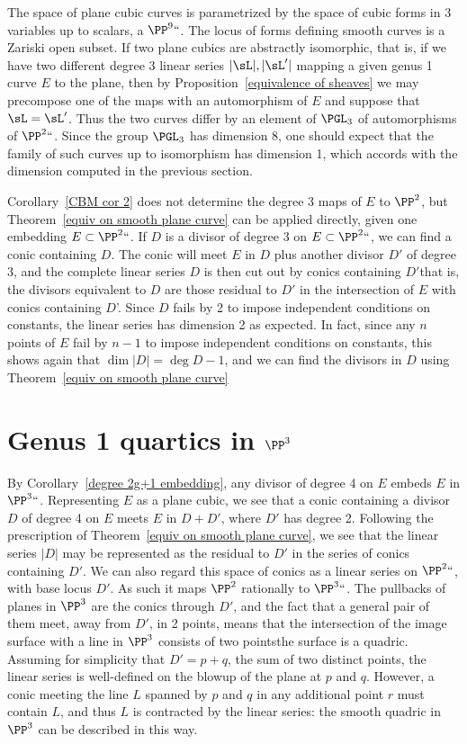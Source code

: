The space of plane cubic curves is parametrized by the space of
cubic forms
%
in 3 variables up to
scalars, a  $\PP^9` `$. The locus of forms defining smooth curves is a Zariski open subset. If two plane cubics are abstractly
isomorphic, that is, if we have two different degree 3 linear series
$|\sL|, |\sL'|$ mapping a given genus 1 curve $E$ to the plane, then by
Proposition~\ref{equivalence of sheaves} we may  precompose one of the maps with an automorphism of $E$
and suppose that $\sL = \sL'$. Thus the two curves differ by an
element of
$\PGL_3$
%
of automorphisms of $\PP^2` `$. Since the group
$\PGL_3$ has dimension 8, one should expect that the family of such
curves up to isomorphism has dimension 1, which accords with the
dimension computed in the previous section.

Corollary~\ref{CBM cor 2} does not determine the degree 3 maps of $E$ to $\PP^{2}$, but Theorem~\ref{equiv on smooth plane curve} can be applied directly, given one embedding $E\subset \PP^2` `$. If $D$ is a divisor of degree 3 on $E\subset \PP^2` `$, we can
find a conic containing $D$. The conic will meet $E$ in $D$ plus another divisor $D'$ of degree 3, and the complete linear series
$D$ is then cut out by conics containing $D'$\emdash  that is, the divisors equivalent to $D$ are those residual to $D'$ in the intersection
of $E$ with conics containing $D$'. Since $D$ fails by 2 to impose independent conditions on constants, the linear series has dimension 2 as expected. In fact, since any $n$ points of $E$ fail by $n-1$ to impose independent conditions on constants, this shows again
that $\dim |D| = \deg D -1$, and we can find the divisors in $D$ using Theorem~\ref{equiv on smooth plane curve}

\section{Genus 1 quartics in $\PP^3$} \label{g=1 in P3}

By Corollary~\ref{degree 2g+1 embedding}, any
divisor of degree 4
on
$E$ embeds $E$ in $\PP^3` `$. Representing $E$ as a plane cubic, we
see that a conic containing a divisor $D$ of degree 4 on $E$ meets $E$
in $D+D'$, where $D'$ has degree 2.
Following the prescription
of Theorem~\ref{equiv on smooth plane curve}, we see that the linear series $|D|$ may be represented as the residual to
$D'$ in the
series of conics containing $D'$. We can also regard this space of conics as a linear series on $\PP^2` `$, with base locus $D'$.
As such it maps $\PP^2$ rationally to $\PP^3` `$. The pullbacks of planes in $\PP^3$ are the conics through $D'$, and the fact that a general pair of them meet,
away from $D'$, in 2 points, means that the intersection of the image surface with a line in $\PP^3$ consists of two points\emdash the surface is a quadric. Assuming for simplicity that $D' = p+q$, the sum of two distinct points, the linear series is well-defined on the blowup of the plane at $p$ and $q$. However, a conic meeting the line $L$ spanned by $p$ and $q$ in any additional point $r$ must contain $L$, and thus $L$ is contracted by the linear series: the smooth quadric in $\PP^3$ can be described in this way.


